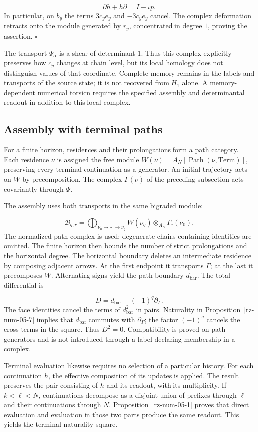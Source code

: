 \[
\partial h+h\partial=I-\iota p.
\]
In particular, on \(b_y\) the terms \(3c_ye_y\) and \(-3c_ye_y\) cancel. The complex deformation retracts onto the module generated by \(r_y\), concentrated in degree \(1\), proving the assertion. \hfill\(\square\)

The transport \(\Psi_\alpha\) is a shear of determinant \(1\). Thus this complex explicitly preserves how \(c_y\) changes at chain level, but its local homology does not distinguish values of that coordinate. Complete memory remains in the labels and transports of the source state; it is not recovered from \(H_1\) alone. A memory-dependent numerical torsion requires the specified assembly and determinantal readout in addition to this local complex.

\subsection{Assembly with terminal paths}
For a finite horizon, residences and their prolongations form a path category. Each residence \(\nu\) is assigned the free module \(W(\nu)=A_N[\operatorname{Path}(\nu,\mathrm{Term})]\), preserving every terminal continuation as a generator. An initial trajectory acts on \(W\) by precomposition. The complex \(\Gamma(\nu)\) of the preceding subsection acts covariantly through \(\Psi\).

The assembly uses both transports in the same bigraded module:

\[
\mathcal B_{q,r}=
\bigoplus_{\nu_0\to\cdots\to\nu_q}
W(\nu_q)\otimes_{A_N}\Gamma_r(\nu_0).
\]
The normalized path complex is used: degenerate chains containing identities are omitted. The finite horizon then bounds the number of strict prolongations and the horizontal degree. The horizontal boundary deletes an intermediate residence by composing adjacent arrows. At the first endpoint it transports \(\Gamma\); at the last it precomposes \(W\). Alternating signs yield the path boundary \(d_{\mathrm{bar}}\). The total differential is

\[
D=d_{\mathrm{bar}}+(-1)^q\partial_\Gamma.
\]
The face identities cancel the terms of \(d_{\mathrm{bar}}^2\) in pairs. Naturality in Proposition~\ref{rz-num-05-7} implies that \(d_{\mathrm{bar}}\) commutes with \(\partial_\Gamma\); the factor \((-1)^q\) cancels the cross terms in the square. Thus \(D^2=0\). Compatibility is proved on path generators and is not introduced through a label declaring membership in a complex.

Terminal evaluation likewise requires no selection of a particular history. For each continuation \(h\), the effective composition of its updates is applied. The result preserves the pair consisting of \(h\) and its readout, with its multiplicity. If \(k<\ell<N\), continuations decompose as a disjoint union of prefixes through \(\ell\) and their continuations through \(N\). Proposition~\ref{rz-num-05-1} proves that direct evaluation and evaluation in those two parts produce the same readout. This yields the terminal naturality square.

